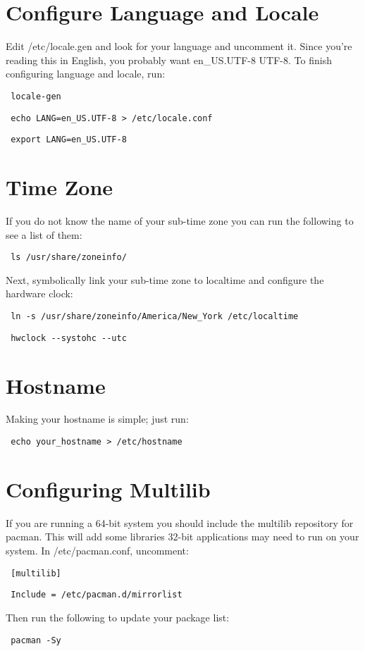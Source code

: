 \documentclass[12pt]{article}
\begin{document}
\section*{Configure Language and Locale}
    Edit /etc/locale.gen and look for your language and uncomment it. Since
    you're reading this in English, you probably want en\_US.UTF-8 UTF-8. To
    finish configuring language and locale, run:
    \begin{verbatim} locale-gen \end{verbatim}
    \begin{verbatim} echo LANG=en_US.UTF-8 > /etc/locale.conf \end{verbatim}
    \begin{verbatim} export LANG=en_US.UTF-8 \end{verbatim}

\section*{Time Zone}
    If you do not know the name of your sub-time zone you can run the following
    to see a list of them:
    \begin{verbatim} ls /usr/share/zoneinfo/ \end{verbatim}
    Next, symbolically link your sub-time zone to localtime and configure the
    hardware clock:
    \begin{verbatim} ln -s /usr/share/zoneinfo/America/New_York /etc/localtime \end {verbatim}
    \begin{verbatim} hwclock --systohc --utc \end {verbatim}

\section*{Hostname}
    Making your hostname is simple; just run:
    \begin{verbatim} echo your_hostname > /etc/hostname \end{verbatim}

\section*{Configuring Multilib}
    If you are running a 64-bit system you should include the multilib
    repository for pacman. This will add some libraries 32-bit applications may
    need to run on your system. In /etc/pacman.conf, uncomment:
    \begin{verbatim} [multilib] \end{verbatim}
    \begin{verbatim} Include = /etc/pacman.d/mirrorlist \end{verbatim}
    Then run the following to update your package list:
    \begin{verbatim} pacman -Sy \end{verbatim}
\end{document}
